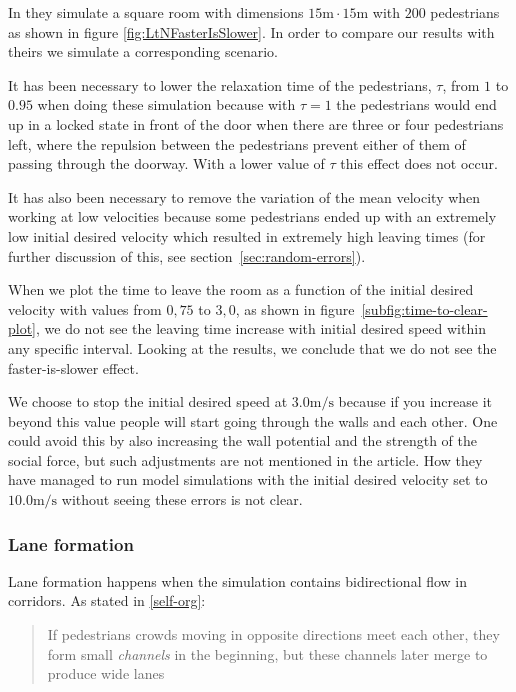 In \cite{helbing00} they simulate a square room with dimensions 
$15\text{m} \cdot 15\text{m}$ with $200$ pedestrians as shown in 
figure \ref{fig:LtNFasterIsSlower}. In order to compare our results 
with theirs we simulate a corresponding scenario.

It has been necessary to lower the relaxation time of the pedestrians, $\tau$, 
from $1$ to $0.95$ when doing these simulation because with $\tau = 1$ the 
pedestrians would end up in a locked state in front of the door when there are 
three or four pedestrians left, where the repulsion between the pedestrians 
prevent either of them of passing through the doorway. With a lower value of 
$\tau$ this effect does not occur. 

It has also been necessary to remove the variation of the mean velocity when 
working at low velocities because some pedestrians ended up with an extremely 
low initial desired velocity which resulted in extremely high leaving times 
(for further discussion of this, see section~\ref{sec:random-errors}).

When we plot the time to leave the room as a function of the initial desired 
velocity with values from $0,75$ to $3,0$, as shown in 
figure~\ref{subfig:time-to-clear-plot}, we do not see the leaving time 
increase with initial desired speed within any specific interval.  Looking at 
the results, we conclude that we do not see the faster-is-slower effect.

We choose to stop the initial desired speed at $3.0 \text{m}/\text{s}$ because 
if you increase it beyond this value people will start going through the walls 
and each other. One could avoid this by also increasing the wall potential and 
the strength of the social force, but such adjustments are not mentioned in 
the article. How they have managed to run model simulations with the initial 
desired velocity set to $10.0 \text{m}/\text{s}$ without seeing these errors 
is not clear.


\subsubsection{Lane formation}
Lane formation happens when the simulation contains bidirectional flow in 
corridors. As stated in \ref{self-org}:

\begin{quote}
    If pedestrians crowds moving in opposite directions meet each other, they 
    form small \emph{channels} in the beginning, but these channels later 
    merge to produce wide lanes
\end{quote}


